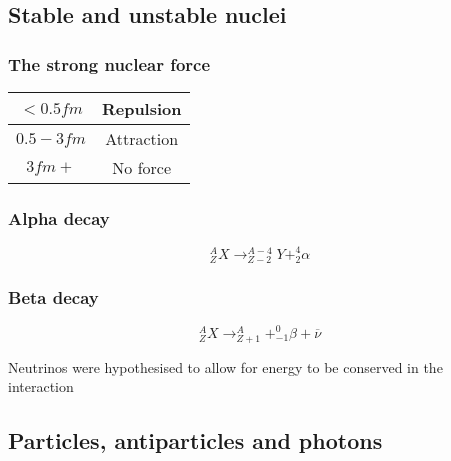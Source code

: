 \documentclass[12pt]{article}
\begin{document}
\subsection{Stable and unstable nuclei}
\subsubsection{The strong nuclear force}
\begin{tabular}{|c|c|}
\hline
$<0.5fm$&Repulsion\\
\hline
$0.5-3fm$&Attraction\\
\hline
$3fm+$&No force\\
\hline
\end{tabular}
\subsubsection{Alpha decay}
{\large
$$^A_ZX\rightarrow ^{A-4}_{Z-2}Y+^4_2\alpha$$
\subsubsection{Beta decay}
$$^A_ZX\rightarrow ^A_{Z+1}+^0_{-1}\beta+\overline{\nu}$$}
Neutrinos were hypothesised to allow for energy to be conserved in the interaction
\subsection{Particles, antiparticles and photons}
\end{document}
